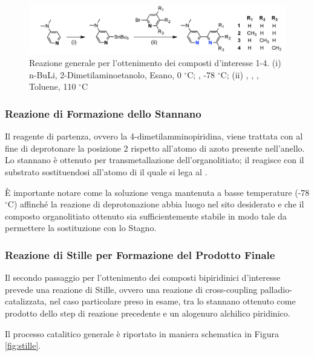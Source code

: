 \documentclass[a4paper, 12pt]{article}
\begin{document}
\begin{figure}[H]
	\centering
	\includegraphics[width=\linewidth]{immagini/rea_g.png}
	\caption{Reazione generale per l'ottenimento dei composti d'interesse 1-4. (i) n-BuLi, 2-Dimetilaminoetanolo, Esano, 0 $^\circ$C; , -78 $^\circ$C; (ii) , , , Toluene, 110 $^\circ$C }
	\label{fig:rea_g}
\end{figure}

\subsubsection{Reazione di Formazione dello Stannano }
Il reagente di partenza, ovvero la 4-dimetilamminopiridina, viene trattata con  al fine di deprotonare la posizione 2 rispetto all'atomo di azoto presente nell'anello. Lo stannano è ottenuto per transmetallazione dell'organolitiato; il  reagisce con il substrato sostituendosi all'atomo di  il quale si lega al .

È importante notare come la soluzione venga mantenuta a basse temperature (-78 $^\circ$C) affinché la reazione di deprotonazione abbia luogo nel sito desiderato e che il composto organolitiato ottenuto sia sufficientemente stabile in modo tale da permettere la sostituzione con lo Stagno.

\subsubsection{Reazione di Stille per Formazione del Prodotto Finale}
Il secondo passaggio per l'ottenimento dei composti bipiridinici d'interesse prevede una reazione di Stille, ovvero una reazione di cross-coupling palladio-catalizzata, nel caso particolare preso in esame, tra lo stannano ottenuto come prodotto dello step di reazione precedente e un alogenuro alchilico piridinico.\autocite{clayden_organic_2012}

Il processo catalitico generale è riportato in maniera schematica in Figura \ref{fig:stille}.
\end{document}
